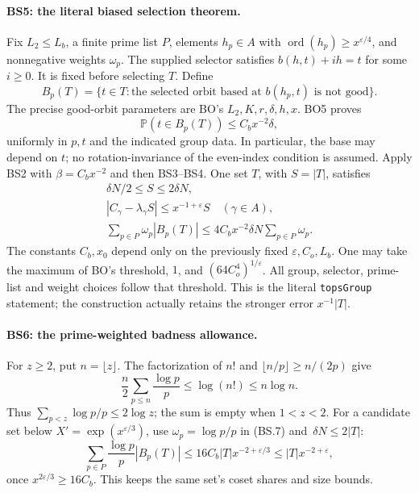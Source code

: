 \paragraph{BS5: the literal biased selection theorem.}
Fix $L_2\le L_b$, a finite prime list $P$, elements $h_p\in A$
with $\operatorname{ord}(h_p)\ge x^{\varepsilon/4}$, and
nonnegative weights $\omega_p$. The supplied selector satisfies
$b(h,t)+ih=t$ for some $i\ge0$. It is fixed before selecting $T$.
Define
\[
 B_p(T)=\{t\in T:\text{the selected orbit based at }b(h_p,t)
                       \text{ is not good}\}.
\]
The precise good-orbit parameters are BO's
$L_2,K,r,\delta,h,x$. BO5 proves
\[
 \mathbb P(t\in B_p(T))\le C_bx^{-2}\delta,
\]
uniformly in $p,t$ and the indicated group data. In particular, the
base may depend on $t$; no rotation-invariance of the even-index
condition is assumed.
Apply BS2 with $\beta=C_bx^{-2}$ and then BS3--BS4. One set $T$,
with $S=|T|$, satisfies
\[
 \boxed{\begin{gathered}
  \delta N/2\le S\le2\delta N,\\
  |C_\gamma-\lambda_\gamma S|\le
                   x^{-1+\varepsilon}S\quad(\gamma\in A),\\
  \sum_{p\in P}\omega_p|B_p(T)|
       \le4C_bx^{-2}\delta N\sum_{p\in P}\omega_p .
 \end{gathered}}                                      \tag{BS.7}
\]
The constants $C_b,x_0$ depend only on the previously fixed
$\varepsilon,C_o,L_b$. One may take the maximum of BO's threshold,
$1$, and $(64C_o^4)^{1/\varepsilon}$.
All group, selector, prime-list and weight choices follow that
threshold. This is the literal \texttt{topsGroup} statement; the
construction actually retains the stronger error $x^{-1}|T|$.

\paragraph{BS6: the prime-weighted badness allowance.}
For $z\ge2$, put $n=\lfloor z\rfloor$.
The factorization of $n!$ and
$\lfloor n/p\rfloor\ge n/(2p)$ give
\[
 \frac n2\sum_{p\le n}\frac{\log p}{p}
 \le\log(n!)\le n\log n.
\]
Thus $\sum_{p<z}\log p/p\le2\log z$; the sum is empty
when $1<z<2$. For a candidate set below
$X'=\exp(x^{\varepsilon/3})$, use
$\omega_p=\log p/p$ in (BS.7) and $\,\delta N\le2|T|$:
\[
 \sum_{p\in P}\frac{\log p}{p}|B_p(T)|
 \le16C_b|T|x^{-2+\varepsilon/3}
 \le |T|x^{-2+\varepsilon},                          \tag{BS.8}
\]
once $x^{2\varepsilon/3}\ge16C_b$. This keeps the same
set's coset shares and size bounds.

